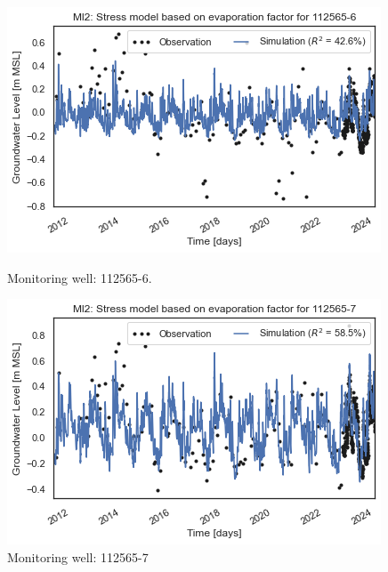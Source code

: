 \begin{figure}[htbp]
    \centering
    \begin{minipage}{0.32\textwidth}
        \centering
        \includegraphics[width=\linewidth]{frontmatter/Rozenburg-fig/1125656(2).png}
        \caption{Monitoring well: 112565-6.}
        \label{fig:112565-6}
    \end{minipage}
    \hfill
    \begin{minipage}{0.32\textwidth}
        \centering
        \includegraphics[width=\linewidth]{frontmatter/Rozenburg-fig/1125657(2).png}
        \caption{Monitoring well: 112565-7}
        \label{fig:112565-7}
    \end{minipage}
    \hfill
    \begin{minipage}{0.32\textwidth}
        \centering

\end{minipage}
\end{figure}
